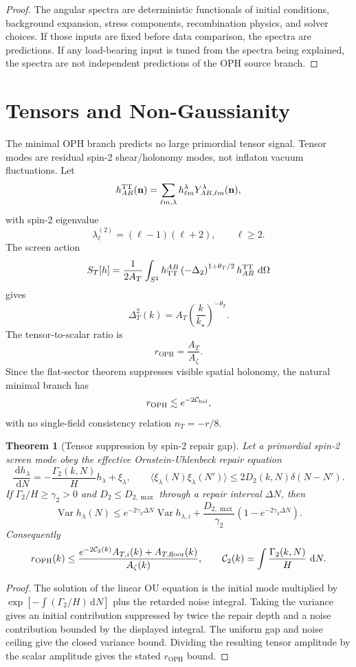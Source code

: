 \documentclass[11pt]{article}
\newtheorem{theorem}{Theorem}[section]
\newcommand{\OPH}{\mathrm{OPH}}
\newcommand{\dd}{\,\mathrm d}
\begin{document}
\begin{proof}
The angular spectra are deterministic functionals of initial conditions, background expansion,
stress components, recombination physics, and solver choices. If those inputs are fixed before data
comparison, the spectra are predictions. If any load-bearing input is tuned from the spectra being
explained, the spectra are not independent predictions of the OPH source branch.
\end{proof}

\section{Tensors and Non-Gaussianity}

The minimal OPH branch predicts no large primordial tensor signal. Tensor modes are residual
spin-2 shear/holonomy modes, not inflaton vacuum fluctuations. Let
\[
h_{AB}^{\rm TT}(\mathbf n)
=
\sum_{\ell m,\lambda}
h_{\ell m}^{\lambda}Y_{AB,\ell m}^{\lambda}(\mathbf n),
\]
with spin-2 eigenvalue
\[
\lambda_\ell^{(2)}=(\ell-1)(\ell+2),\qquad \ell\ge2.
\]
The screen action
\[
S_T[h]
=
\frac{1}{2A_T}
\int_{S^2}
h^{AB}_{\rm TT}
\left(-\Delta_2\right)^{1+\theta_T/2}
h^{\rm TT}_{AB}\,\dd\Omega
\]
gives
\[
\Delta_T^2(k)
=
A_T\left(\frac{k}{k_\star}\right)^{-\theta_T}.
\]
The tensor-to-scalar ratio is
\[
r_{\OPH}=\frac{A_T}{A_\zeta}.
\]
Since the flat-sector theorem suppresses visible spatial holonomy, the natural minimal branch has
\[
r_{\OPH}\lesssim e^{-2\mathcal C_{\rm hol}},
\]
with no single-field consistency relation \(n_T=-r/8\).

\begin{theorem}[Tensor suppression by spin-2 repair gap]\label{thm:tensor-gap}
Let a primordial spin-2 screen mode obey the effective Ornstein-Uhlenbeck repair equation
\[
\frac{\dd h_\lambda}{\dd N}
=
-\frac{\Gamma_2(k,N)}{H}h_\lambda+\xi_\lambda,
\qquad
\langle\xi_\lambda(N)\xi_\lambda(N')\rangle
\le
2D_2(k,N)\delta(N-N').
\]
If \(\Gamma_2/H\ge\gamma_2>0\) and \(D_2\le D_{2,\max}\) through a repair interval
\(\Delta N\), then
\[
\operatorname{Var}h_\lambda(N)
\le
e^{-2\gamma_2\Delta N}\operatorname{Var}h_{\lambda,i}
+
\frac{D_{2,\max}}{\gamma_2}\left(1-e^{-2\gamma_2\Delta N}\right).
\]
Consequently
\[
r_{\OPH}(k)
\le
\frac{
e^{-2\mathcal C_2(k)}A_{T,i}(k)+A_{T,\rm floor}(k)
}{A_\zeta(k)},
\qquad
\mathcal C_2(k)=\int\frac{\Gamma_2(k,N)}{H}\,\dd N .
\]
\end{theorem}

\begin{proof}
The solution of the linear OU equation is the initial mode multiplied by
\(\exp[-\int(\Gamma_2/H)\dd N]\) plus the retarded noise integral. Taking the variance gives an
initial contribution suppressed by twice the repair depth and a noise contribution bounded by the
displayed integral. The uniform gap and noise ceiling give the closed variance bound. Dividing the
resulting tensor amplitude by the scalar amplitude gives the stated \(r_{\OPH}\) bound.
\end{proof}
\end{document}
